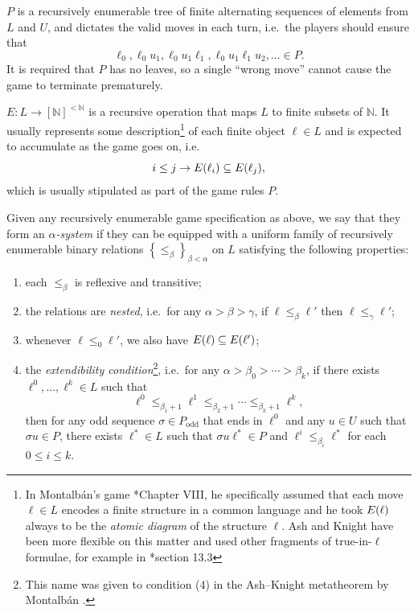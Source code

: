 \documentclass[11pt]{article}
\theoremstyle{plain}
\theoremstyle{definition}
\begin{document}
$P$ is a recursively enumerable tree of finite alternating sequences of elements from $L$ and $U$, and dictates the valid moves in each turn, i.e.\ the players should ensure that
\[\ell_0, \ell_0 u_1, \ell_0 u_1 \ell_1, \ell_0 u_1 \ell_1 u_2, \ldots \in P.\]
It is required that $P$ has no leaves, so a single ``wrong move'' cannot cause the game to terminate prematurely.

$E : L \rightarrow \left[\mathbb{N}\right]^{<\mathbb{N}}$ is a recursive operation that maps $L$ to finite subsets of $\mathbb{N}$. It usually represents some description\footnote{In Montalb\'an's game \cite{montalban26-computable-structure}*{Chapter VIII}, he specifically assumed that each move $\ell \in L$ encodes a finite structure in a common language and he took $E\mleft(\ell\mright)$ always to be the \emph{atomic diagram} of the structure $\ell$. Ash and Knight have been more flexible on this matter and used other fragments of true-in-$\ell$ formulae, for example in \cite{ash-knight00-computable-structures}*{section 13.3}} of each finite object $\ell \in L$ and is expected to accumulate as the game goes on, i.e.
\[i \leq j \rightarrow E\mleft(\ell_i\mright) \subseteq E\mleft(\ell_j\mright),\]
which is usually stipulated as part of the game rules $P$.

Given any recursively enumerable game specification as above, we say that they form an \emph{$\alpha$-system} if they can be equipped with a uniform family of recursively enumerable binary relations $\left\{\leq_\beta\right\}_{\beta < \alpha}$ on $L$ satisfying the following properties:
\begin{enumerate}[label=(\arabic*)]
  \item each $\leq_\beta$ is reflexive and transitive;
  \item the relations are \emph{nested}, i.e.\ for any $\alpha > \beta > \gamma$, if $\ell \leq_\beta \ell'$ then $\ell \leq_\gamma \ell'$;
  \item whenever $\ell \leq_0 \ell'$, we also have $E\mleft(\ell\mright) \subseteq E\mleft(\ell'\mright)$;
  \item the \emph{extendibility condition}\footnote{This name was given to condition (4) in the Ash--Knight metatheorem by Montalb\'an \cite{montalban14-priority-arguments}.}, i.e.\ for any $\alpha > \beta_0 > \cdots > \beta_k$, if there exists $\ell^0, \ldots, \ell^k \in L$ such that
        \[\ell^0 \leq_{\beta_1 + 1} \ell^1 \leq_{\beta_2 + 1} \cdots \leq_{\beta_k + 1} \ell^k,\]
        then for any odd sequence $\sigma \in P_\text{odd}$ that ends in $\ell^0$ and any $u \in U$ such that $\sigma u \in P$, there exists $\ell^* \in L$ such that $\sigma u \ell^* \in P$ and $\ell^i \leq_{\beta_i} \ell^*$ for each $0 \leq i \leq k$.
\end{enumerate}
\end{document}
